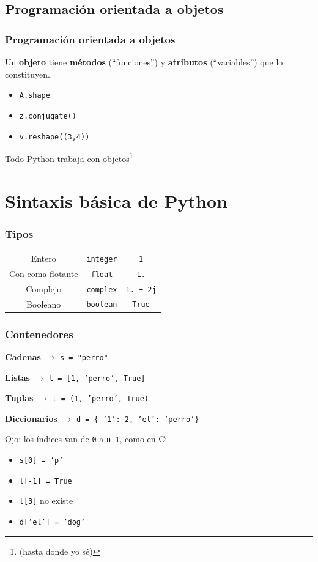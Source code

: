 \documentclass{beamer}
\begin{document}
\subsection{Programación orientada a objetos}

\begin{frame}\frametitle{Programación orientada a objetos}
	Un \textbf{objeto} tiene \textbf{métodos} (``funciones'') y \textbf{atributos} (``variables'') que lo constituyen.

	\begin{itemize}
		\item \texttt{A.shape}
		\item \texttt{z.conjugate()}
		\item \texttt{v.reshape((3,4))}
	\end{itemize}

	Todo Python trabaja con objetos\footnote{\tiny (hasta donde yo sé)}
\end{frame}


\section{Sintaxis básica de Python}

\begin{frame}\frametitle{Tipos}
	\centering
	\begin{tabular}{ccc}
		Entero 				& \texttt{integer} 			& \texttt{1} \\
		Con coma flotante	& \texttt{float} 			& \texttt{1.} \\
		Complejo 			& \texttt{complex} 			& \texttt{1. + 2j} \\
		Booleano 			& \texttt{boolean} 			& \texttt{True} \\
	\end{tabular}
\end{frame}

\begin{frame}\frametitle{Contenedores}
	\textbf{Cadenas} $\rightarrow$ \texttt{s = "perro"}

	\textbf{Listas} $\rightarrow$ \texttt{l = [1, 'perro', True]}

	\textbf{Tuplas} $\rightarrow$ \texttt{t = (1, 'perro', True)}

	\textbf{Diccionarios} $\rightarrow$ \texttt{d = \{ '1': 2, 'el': 'perro'\}}

	Ojo: los índices van de \texttt{0} a \texttt{n-1}, como en C: 
	\begin{itemize}
		\item \texttt{s[0] = 'p'}
		\item \texttt{l[-1] = True}
		\item \texttt{t[3]} no existe
		\item \texttt{d['el'] = 'dog'}
	\end{itemize}
\end{frame}
\end{document}
